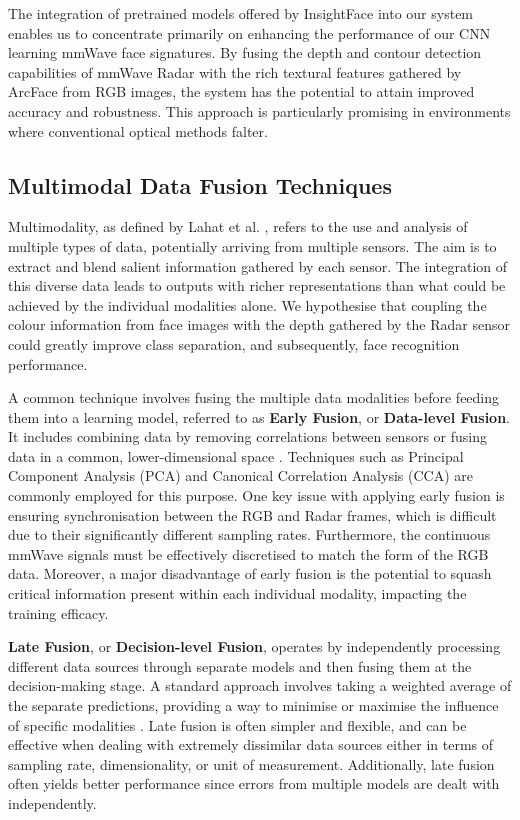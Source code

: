 \documentclass{interim}
\begin{document}
The integration of pretrained models offered by InsightFace into our system enables us to concentrate primarily on enhancing the performance of our CNN learning mmWave face signatures. By fusing the depth and contour detection capabilities of mmWave Radar with the rich textural features gathered by ArcFace from RGB images, the system has the potential to attain improved accuracy and robustness. This approach is particularly promising in environments where conventional optical methods falter.


\subsection{Multimodal Data Fusion Techniques}
\label{background:multimodal_data_fusion_techniques}
Multimodality, as defined by Lahat et al. \cite{lahat2015multimodal}, refers to the use and analysis of multiple types of data, potentially arriving from multiple sensors. The aim is to extract and blend salient information gathered by each sensor. The integration of this diverse data leads to outputs with richer representations than what could be achieved by the individual modalities alone. We hypothesise that coupling the colour information from face images with the depth gathered by the Radar sensor could greatly improve class separation, and subsequently, face recognition performance.

A common technique involves fusing the multiple data modalities before feeding them into a learning model, referred to as \textbf{Early Fusion}, or \textbf{Data-level Fusion}. It includes combining data by removing correlations between sensors or fusing data in a common, lower-dimensional space \cite{khaleghi2013multisensor}. Techniques such as Principal Component Analysis (PCA) and Canonical Correlation Analysis (CCA) are commonly employed for this purpose. One key issue with applying early fusion is ensuring synchronisation between the RGB and Radar frames, which is difficult due to their significantly different sampling rates. Furthermore, the continuous mmWave signals must be effectively discretised to match the form of the RGB data. Moreover, a major disadvantage of early fusion is the potential to squash critical information present within each individual modality, impacting the training efficacy.

\textbf{Late Fusion}, or \textbf{Decision-level Fusion}, operates by independently processing different data sources through separate models and then fusing them at the decision-making stage. A standard approach involves taking a weighted average of the separate predictions, providing a way to minimise or maximise the influence of specific modalities \cite{pawlowski2023effective}. Late fusion is often simpler and flexible, and can be effective when dealing with extremely dissimilar data sources either in terms of sampling rate, dimensionality, or unit of measurement. Additionally, late fusion often yields better performance since errors from multiple models are dealt with independently.
\end{document}
